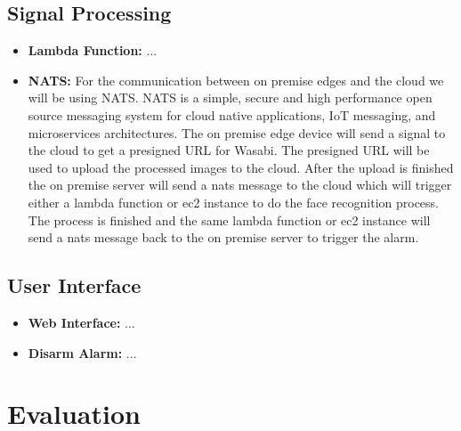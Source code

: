 \documentclass[conference]{IEEEtran}
\begin{document}
\subsection{Signal Processing}
\begin{itemize}
    \item \textbf{Lambda Function:} ...
    \item \textbf{NATS:} For the communication between on premise edges and the cloud we will be using NATS. NATS is a simple, secure and high performance open source messaging system for cloud native applications, IoT messaging, and microservices architectures.
          The on premise edge device will send a signal to the cloud to get a presigned URL for Wasabi. The presigned URL will be used to upload the processed images to the cloud.
          After the upload is finished the on premise server will send a nats message to the cloud which will trigger either a lambda function or ec2 instance to do the face recognition process. 
          The process is finished and the same lambda function or ec2 instance will send a nats message back to the on premise server to trigger the alarm.
\end{itemize}
\subsection{User Interface}
\begin{itemize}
    \item \textbf{Web Interface:} ...
    \item \textbf{Disarm Alarm:} ...
\end{itemize}

\section{Evaluation}
\label{sec:evaluation}
\end{document}
